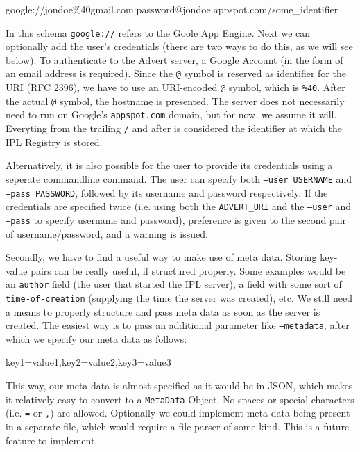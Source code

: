 \begin{center}
\begin{code}
google://jondoe\%40gmail.com:password@jondoe.appspot.com/some_identifier
\end{code}
\end{center}

In this schema \texttt{google://} refers to the Goole App Engine. Next we can
optionally add the user's credentials (there are two ways to do this, as we
will see below). To authenticate to the Advert server, a Google Account (in
the form of an email address is required). Since the \texttt{@} symbol is
reserved as identifier for the URI (RFC 2396), we have to use an URI-encoded
\texttt{@} symbol, which is \texttt{\%40}. After the actual \texttt{@}
symbol, the hostname is presented. The server does not necessarily need to run
on Google's \texttt{appspot.com} domain, but for now, we assume it will.
Everyting from the trailing \texttt{/} and after is considered the identifier at
which the IPL Registry is stored.

Alternatively, it is also possible for the user to provide its credentials
using a seperate commandline command. The user can specify both \texttt{--user
USERNAME} and \texttt{--pass PASSWORD}, followed by its username and password
respectively. If the credentials are specified twice (i.e. using both the
\texttt{ADVERT\_URI} and the \texttt{--user} and \texttt{--pass} to specify
username and password), preference is given to the second pair of
username/password, and a warning is issued.

Secondly, we have to find a useful way to make use of meta data. Storing
key-value pairs can be really useful, if structured properly. Some examples
would be an \texttt{author} field (the user that started the IPL server), a
field with some sort of \texttt{time-of-creation} (supplying the time the
server was created), etc. We still need a means to properly structure
and pass meta data as soon as the server is created. The easiest way is to pass
an additional parameter like \texttt{--metadata}, after which we specify our
meta data as follows:

\begin{center}
\begin{code}
key1=value1,key2=value2,key3=value3
\end{code}
\end{center}

This way, our meta data is almost specified as it would be in JSON, which makes
it relatively easy to convert to a \texttt{MetaData} Object. No spaces or
special characters (i.e. \texttt{=} or \texttt{,}) are allowed. Optionally we
could implement meta data being present in a separate file, which would require a
file parser of some kind. This is a future feature to implement.


